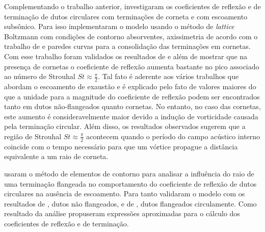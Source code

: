 Complementando o trabalho anterior,  investigaram os coeficientes de reflexão e de terminação de dutos circulares com terminações de corneta e com escoamento subsônico. Para isso implementaram o modelo usando o método de \textit{lattice} Boltzmann com condições de contorno absorventes, axissimetria de acordo com o trabalho de  e paredes curvas para a consolidação das terminações em cornetas. Com esse trabalho foram validados os resultados de  e  além de mostrar que na presença de cornetas o coeficiente de reflexão aumenta bastante no pico associado ao número de Strouhal $St \approx \frac{\pi}{2}$. Tal fato é aderente aos vários trabalhos que abordam o escoamento de exaustão e é explicado pelo fato de valores maiores do que a unidade para a magnitude do coeficiente de reflexão podem ser encontrados tanto em dutos não-flangeados quanto cornetas. No entanto, no caso das cornetas, este aumento é consideravelmente maior devido a indução de vorticidade causada pela terminação circular. Além disso, os resultados observados sugerem que a região de Strouhal $St \approx \frac{\pi}{2}$ acontecem quando o período do campo acústico interno coincide com o tempo necessário para que um vórtice propague a distância equivalente a um raio de corneta.

 usaram o método de elementos de contorno para analisar a influência do raio de uma terminação flangeada no comportamento do coeficiente de reflexão de dutos circulares na ausência de escoamento. Para tanto validaram o modelo com os resultados de , dutos não flangeados, e de , dutos flangeados circulamente. Como resultado da análise propuseram expressões aproximadas para o cálculo dos coeficientes de reflexão e de terminação.
